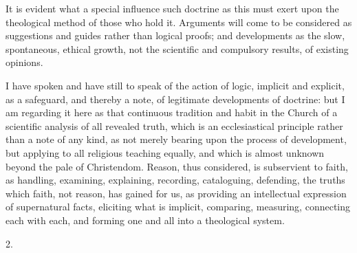 It is evident what a special influence such doctrine as this must
exert upon the theological method of those who hold it. Arguments will
come to be considered as suggestions and guides rather than logical
proofs; and developments as the slow, spontaneous, ethical growth, not
the scientific and compulsory results, of existing opinions.


I have spoken and have still to speak of the action of logic,
implicit and explicit, as a safeguard, and thereby a note, of
legitimate developments of doctrine: but I am regarding it here as
that continuous tradition and habit in the Church of a scientific
analysis of all revealed truth, which is an ecclesiastical principle
rather than a note of any kind, as not merely bearing upon the process
of development, but applying to all religious teaching equally, and
which is almost unknown beyond the pale of Christendom. Reason, thus
considered, is subservient to faith, as handling, examining,
explaining, recording, cataloguing, defending, the truths which faith,
not reason, has gained for us, as providing an intellectual expression
of supernatural facts, eliciting what is implicit, comparing,
measuring, connecting each with each, and forming one and all into a
theological system.

2.

